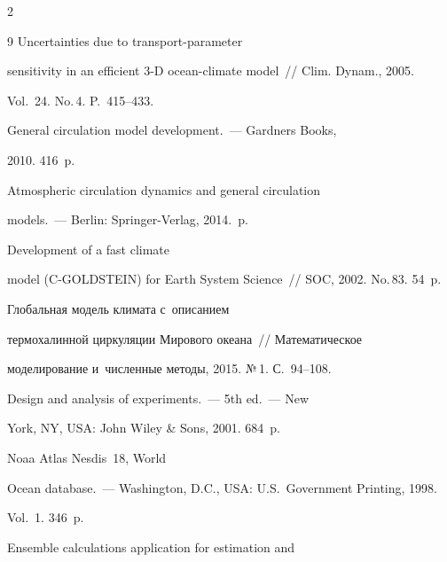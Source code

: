 \begin{multicols}{2}
{{\begin{thebibliography}{9}
   Uncertainties due to transport-parameter 


sensitivity in an efficient 3-D ocean-climate model~// Clim. Dynam., 2005. 


Vol.~24. No.\,4. P.~415--433.




 General circulation model development.~--- Gardners Books, 


2010. 416~p. 




   Atmospheric circulation dynamics and general circulation 


models.~--- Berlin: Springer-Verlag, 2014.~p.




   Development of a fast climate 


model (C-GOLDSTEIN) for Earth System Science~// SOC, 2002. No.\,83. 54~p.




   Глобальная модель климата с~описанием 


термохалинной циркуляции Мирового океана~// Математическое 


моделирование и~численные методы, 2015. №\,1. С.~94--108.












   Design and analysis of experiments.~--- 5th ed.~--- New 


York, NY, USA: John Wiley \& Sons, 2001. 684~p.




   Noaa Atlas Nesdis~18, World 


Ocean database.~--- Washington, D.C., USA: U.S.\ Government Printing, 1998. 


 Vol.~1. 346~p.




   Ensemble calculations application for estimation and 



\end{thebibliography}}}
\end{multicols}
